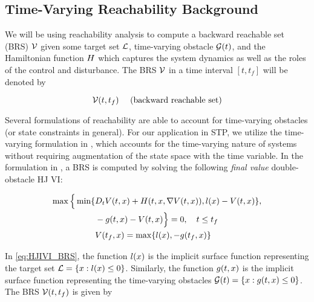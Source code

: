 \subsection{Time-Varying Reachability Background \label{sec:HJIVI}}
We will be using reachability analysis to compute a backward reachable set (BRS) $\mathcal{V}$ given some target set $\mathcal{L}$, time-varying obstacle $\mathcal{G}(t)$, and the Hamiltonian function $H$ which captures the system dynamics as well as the roles of the control and disturbance. The BRS $\mathcal{V}$ in a time interval $[t, t_f]$ will be denoted by

\begin{equation}
\mathcal{V}(t, t_f) \quad \text{ (backward reachable set)}
\end{equation}

Several formulations of reachability are able to account for time-varying obstacles \cite{Bokanowski11, Fisac15} (or state constraints in general). For our application in STP, we utilize the time-varying formulation in \cite{Fisac15}, which accounts for the time-varying nature of systems without requiring augmentation of the state space with the time variable. In the formulation in \cite{Fisac15}, a BRS is computed by solving the following \textit{final value} double-obstacle HJ VI:

\begin{equation}
\label{eq:HJIVI_BRS}
\begin{aligned}
\max \Big\{ \min \{&D_t V(t, x) + H(t, x, \nabla V(t, x)), l(x) - V(t, x) \}, \\
&-g(t, x) - V(t, x) \Big\} = 0, \quad t \le t_f \\
&V(t_f, x) = \max\{l(x), -g(t_f, x)\}
\end{aligned}
\end{equation}

%
%
In \eqref{eq:HJIVI_BRS}, the function $l(x)$ is the implicit surface function representing the target set $\mathcal{L} = \{x: l(x) \le 0\}$. Similarly, the function $g(t, x)$ is the implicit surface function representing the time-varying obstacles $\mathcal{G}(t) = \{x: g(t,x)\le 0\}$. The BRS $\mathcal{V}(t, t_f)$ is given by

